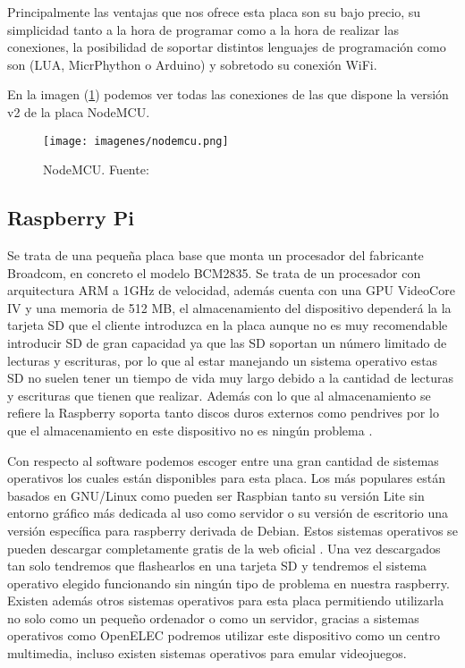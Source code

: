 Principalmente las ventajas que nos ofrece esta placa son su bajo precio, su simplicidad tanto a la hora de programar como a la hora de realizar las conexiones, la posibilidad de soportar distintos lenguajes de programación como son (LUA, MicrPhython o Arduino) y sobretodo su conexión WiFi.

En la imagen (\ref{fig:nodemcu}) podemos ver todas las conexiones de las que dispone la versión v2 de la placa NodeMCU.

\begin{figure}[H]
	\centering
	\texttt{[image: imagenes/nodemcu.png]}
	\caption[NodeMCU.]{NodeMCU. Fuente: \cite{nodemcuversiones}}
	\label{fig:nodemcu}
\end{figure}


\subsection{Raspberry Pi}

Se trata de una pequeña placa base que monta un procesador del fabricante Broadcom, en concreto el modelo BCM2835. Se trata de un procesador con arquitectura ARM a 1GHz de velocidad, además cuenta con una GPU VideoCore IV y una memoria de 512 MB, el almacenamiento del dispositivo dependerá la la tarjeta SD que el cliente introduzca en la placa aunque no es muy recomendable introducir SD de gran capacidad ya que las SD soportan un número limitado de lecturas y escrituras, por lo que al estar manejando un sistema operativo estas SD no suelen tener un tiempo de vida muy largo debido a la cantidad de lecturas y escrituras que tienen que realizar. Además con lo que al almacenamiento se refiere la Raspberry soporta tanto discos duros externos como pendrives por lo que el almacenamiento en este dispositivo no es ningún problema \cite{raspberrywikipedia}.

Con respecto al software podemos escoger entre una gran cantidad de sistemas operativos los cuales están disponibles para esta placa. Los más populares están basados en GNU/Linux como pueden ser Raspbian tanto su versión Lite sin entorno gráfico más dedicada al uso como servidor o su versión de escritorio una versión específica para raspberry derivada de Debian. Estos sistemas operativos se pueden descargar completamente gratis de la web oficial \cite{raspbianoficial}. Una vez descargados tan solo tendremos que flashearlos en una tarjeta SD y tendremos el sistema operativo elegido funcionando sin ningún tipo de problema en nuestra raspberry. Existen además otros sistemas operativos para esta placa permitiendo utilizarla no solo como un pequeño ordenador o como un servidor, gracias a sistemas operativos como OpenELEC podremos utilizar este dispositivo como un centro multimedia, incluso existen sistemas operativos para emular videojuegos.

